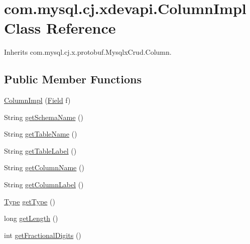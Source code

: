 \hypertarget{classcom_1_1mysql_1_1cj_1_1xdevapi_1_1_column_impl}{}\section{com.\+mysql.\+cj.\+xdevapi.\+Column\+Impl Class Reference}
\label{classcom_1_1mysql_1_1cj_1_1xdevapi_1_1_column_impl}


Inherits com.\+mysql.\+cj.\+x.\+protobuf.\+Mysqlx\+Crud.\+Column.

\subsection*{Public Member Functions}
\begin{DoxyCompactItemize}
\item 
\mbox{\hyperlink{classcom_1_1mysql_1_1cj_1_1xdevapi_1_1_column_impl_ab6b38221345090a79280015607816b56}{Column\+Impl}} (\mbox{\hyperlink{classcom_1_1mysql_1_1cj_1_1result_1_1_field}{Field}} f)
\item 
String \mbox{\hyperlink{classcom_1_1mysql_1_1cj_1_1xdevapi_1_1_column_impl_a355c7675aea90dbe7f776bf35da8aea6}{get\+Schema\+Name}} ()
\item 
String \mbox{\hyperlink{classcom_1_1mysql_1_1cj_1_1xdevapi_1_1_column_impl_a0a5ca0805117abdd3cb8e9b1df835f5b}{get\+Table\+Name}} ()
\item 
String \mbox{\hyperlink{classcom_1_1mysql_1_1cj_1_1xdevapi_1_1_column_impl_a1bd658c2a13dce3547e237ea613dd3a5}{get\+Table\+Label}} ()
\item 
String \mbox{\hyperlink{classcom_1_1mysql_1_1cj_1_1xdevapi_1_1_column_impl_a1b7de47a2cf22b8deae3b742c94bf072}{get\+Column\+Name}} ()
\item 
String \mbox{\hyperlink{classcom_1_1mysql_1_1cj_1_1xdevapi_1_1_column_impl_ad9fd6f38b364e909a466db6797dbee17}{get\+Column\+Label}} ()
\item 
\mbox{\hyperlink{enumcom_1_1mysql_1_1cj_1_1xdevapi_1_1_type}{Type}} \mbox{\hyperlink{classcom_1_1mysql_1_1cj_1_1xdevapi_1_1_column_impl_a499f7b831c4630137ef3a99ab8c346f7}{get\+Type}} ()
\item 
long \mbox{\hyperlink{classcom_1_1mysql_1_1cj_1_1xdevapi_1_1_column_impl_a09cd02730acbbfdda9445bb2c27ff72d}{get\+Length}} ()
\item 
int \mbox{\hyperlink{classcom_1_1mysql_1_1cj_1_1xdevapi_1_1_column_impl_a413538a329763326dc547623f757fedd}{get\+Fractional\+Digits}} ()
\item 

\end{DoxyCompactItemize}
